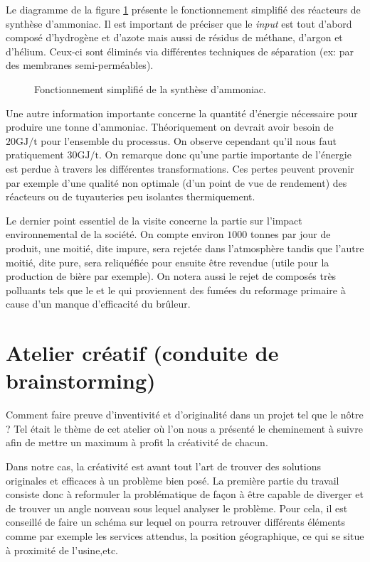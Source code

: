 Le diagramme de la figure \ref{fig:synthese} présente le fonctionnement simplifié 
des réacteurs de synthèse d'ammoniac. Il est important de préciser que le \emph{input}
est tout d'abord composé d'hydrogène et d'azote mais aussi de résidus de méthane, 
d'argon et d'hélium. Ceux-ci sont éliminés via différentes techniques 
de séparation (ex: par des membranes semi-perméables). 

\begin{figure}[h!]
	\begin{center}
		
	\end{center}
	\caption{Fonctionnement simplifié de la synthèse d'ammoniac.}
	\label{fig:synthese}
\end{figure}

Une autre information importante concerne la quantité d'énergie nécessaire pour produire
une tonne d'ammoniac. Théoriquement on devrait avoir besoin de $20 \si{\giga\joule/\tonne}$
pour l'ensemble du processus. On observe cependant qu'il nous faut 
pratiquement $30 \si{\giga\joule/\tonne}$. On remarque donc qu'une partie 
importante de l'énergie est perdue à travers les différentes transformations. 
Ces pertes peuvent provenir par exemple d'une qualité non optimale (d'un point de vue 
de rendement) des réacteurs ou de tuyauteries peu isolantes thermiquement.

Le dernier point essentiel de la visite concerne la partie sur l'impact environnemental 
de la société. On compte environ $1000$ tonnes par jour de  produit, une moitié,
dite impure, sera rejetée dans l'atmosphère tandis que l'autre moitié, dite pure, 
sera reliquéfiée pour ensuite être revendue (utile pour la production de bière par exemple).
On notera aussi le rejet de composés très polluants tels que le  et le  
qui proviennent des fumées du reformage primaire à cause d'un manque d'efficacité
du brûleur.

\section{Atelier créatif (conduite de brainstorming)}

Comment faire preuve d'inventivité et d'originalité dans un projet tel que le nôtre ?
Tel était le thème de cet atelier où l'on nous a présenté le cheminement 
à suivre afin de mettre un maximum à profit la créativité de chacun.

Dans notre cas, la créativité est avant tout l'art de trouver des solutions 
originales et efficaces à un problème bien posé. 
La première partie du travail consiste donc à reformuler la problématique de façon 
à être capable de diverger et de trouver un angle nouveau sous lequel analyser le problème. 
Pour cela, il est conseillé de faire un schéma sur lequel on pourra retrouver différents
éléments comme par exemple les services attendus, la position géographique, 
ce qui se situe à proximité de l’usine,etc.

